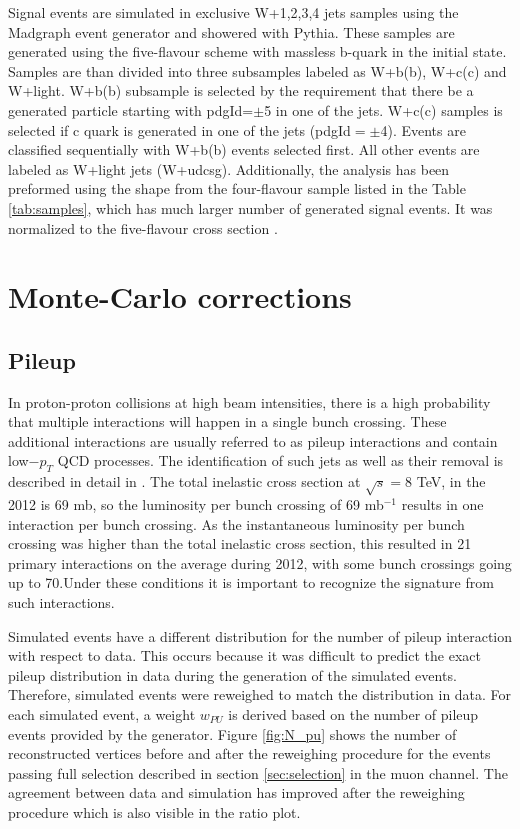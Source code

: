 Signal events are simulated in exclusive W+1,2,3,4 jets samples using the Madgraph event generator and showered with Pythia. These samples are generated using the five-flavour scheme with massless b-quark in the initial state. Samples are than divided into three subsamples labeled as W+b(b), W+c(c) and W+light. W+b(b) subsample is selected by the requirement that there be a generated particle starting with pdgId=$\pm$5 in one of the jets. W+c(c) samples is selected if c quark is generated in one of the jets (pdgId$=\pm$4). Events are classified sequentially with W+b(b) events selected first. All other events are labeled as W+light jets (W+udcsg). Additionally, the analysis has been preformed using the shape from the four-flavour sample listed in the Table \ref{tab:samples}, which has much larger number of generated signal events. It was normalized to the five-flavour cross section .



\section{Monte-Carlo corrections}
\label{sec:mcSF}

\subsection{Pileup}

In proton-proton collisions at high beam intensities, there is a high probability that multiple interactions will happen in a single bunch crossing. These additional interactions are usually referred to as pileup interactions and contain low$-p_T$ QCD processes. The identification of such jets as well as their removal is described in detail in \cite{CMS:2013wea}. The total inelastic cross section at $\sqrt{s}=$8 TeV, in the 2012 is 69 mb, so the luminosity per bunch crossing of 69 mb$^{-1}$ results in one interaction per bunch crossing. As the instantaneous luminosity per bunch crossing was higher than the total inelastic cross section, this resulted in 21 primary interactions on the average during 2012, with some bunch crossings  going up to 70.Under these conditions it is important to recognize the signature from such interactions.  
\par Simulated events have a different distribution for the number of pileup interaction with respect to data. This occurs because it was difficult to predict the exact pileup distribution in data during the generation of the simulated events. Therefore, simulated events were reweighed to match the distribution in data. For each simulated event, a weight $w_{PU}$ is derived based on the number of pileup events provided by the generator. Figure \ref{fig:N_pu} shows the number of reconstructed vertices before and after the reweighing procedure for the events passing full selection described in section \ref{sec:selection} in the muon channel. The agreement between data and simulation has improved after the reweighing procedure which is also visible in the ratio plot. 

